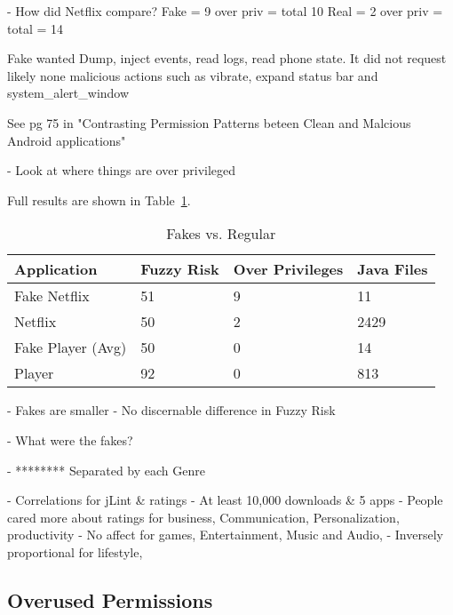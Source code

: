 \documentclass{sig-alternate}
\begin{document}
- How did Netflix compare?
Fake = 9 over priv = total 10
Real = 2 over priv = total = 14


Fake wanted Dump, inject events, read logs, read phone state. It did not request likely none malicious actions such as vibrate, expand status bar and system\_alert\_window

See pg 75 in "Contrasting Permission Patterns beteen Clean and Malcious Android applications"


- Look at where things are over privileged

Full results are shown in Table~\ref{Table:fakesvsRegular}.



\begin{center}

\begin{table}[ht]
\caption{Fakes vs. Regular}
\label{Table:fakesvsRegular}
  \begin{tabular}{ l | l | l | l }

    \bfseries Application  & \bfseries Fuzzy Risk  & \bfseries Over Privileges & \bfseries Java Files \\ \hline
    Fake Netflix & 51 & 9 & 11 \\ \hline
    Netflix & 50 & 2 & 2429 \\ \hline \hline
    Fake Player (Avg) & 50 & 0 & 14 \\ \hline
    Player & 92 & 0 & 813 \\ 
  \end{tabular}
\end{table}
\end{center}




- Fakes are smaller
- No discernable difference in Fuzzy Risk


- What were the fakes?



- ******** Separated by each Genre

- Correlations for jLint \& ratings
-		At least 10,000 downloads \& 5 apps
-	People cared more about ratings for business, Communication, Personalization, productivity
-	No affect for games, Entertainment,  Music and Audio, 
- 	Inversely proportional for lifestyle, 


\subsection{Overused Permissions}
\end{document}
